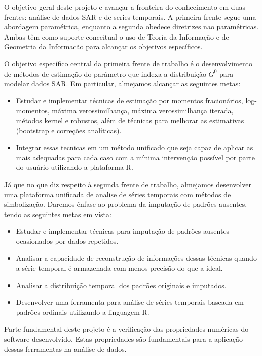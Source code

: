 \documentclass[12pt]{article}
\begin{document}
\vspace{0.5cm}

O objetivo geral deste projeto e avançar a fronteira do conhecimento em duas frentes: análise de dados SAR e de series temporais. A primeira frente segue uma abordagem paramétrica, enquanto a segunda obedece diretrizes nao paramétricas. Ambas têm como suporte conceitual o uso de Teoria da Informação e de Geometria da Informacão para alcançar os objetivos específicos.

O objetivo específico central da primeira frente de trabalho é o desenvolvimento de métodos de estimação do parâmetro que indexa a distribuição $G^{0}$ para modelar dados SAR. Em particular, almejamos alcançar as seguintes metas:

\begin{itemize}
    \item Estudar e implementar técnicas de estimação por momentos fracionários, log-momentos, máxima verossimilhança, máxima verossimilhança iterada, métodos kernel e robustos, além de técnicas para melhorar as estimativas (bootstrap e correções analíticas).
    \item Integrar essas tecnicas em um método unificado que seja capaz de aplicar as mais adequadas para cada caso com a mínima intervenção possível por parte do usuário utilizando a plataforma R.
\end{itemize}

Já que no que diz respeito à segunda frente de trabalho, almejamos desenvolver uma plataforma unificada de analise de séries temporais com métodos de simbolização. Daremos ênfase ao problema da imputação de padrões ausentes, tendo as seguintes metas em vista:

\begin{itemize}
    \item Estudar e implementar técnicas para imputação de padrões ausentes ocasionados por dados repetidos.
    \item Analisar a capacidade de reconstrução de informações dessas técnicas quando a série temporal é armazenada com menos precisão do que a ideal. 
    \item Analisar a distribuição temporal dos padrões originais e imputados.
    \item Desenvolver uma ferramenta para análise de séries temporais baseada em padrões ordinais utilizando a linguagem R.
\end{itemize}

Parte fundamental deste projeto é a verificação das propriedades numéricas do software desenvolvido. Estas propriedades são fundamentais para a aplicação dessas ferramentas na análise de dados. 
\end{document}
